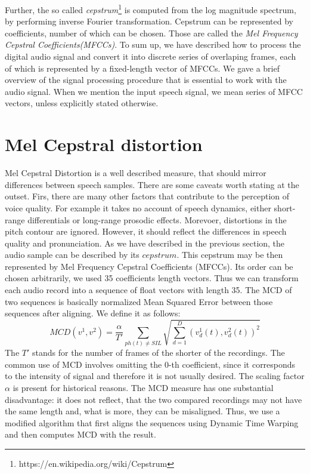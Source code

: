 Further, the so called \textit{cepstrum}\footnote{https://en.wikipedia.org/wiki/Cepstrum} is computed from the log magnitude spectrum, by performing inverse Fourier transformation.
Cepstrum can be represented by coefficients, number of which can be chosen.
Those are called the \textit{Mel Frequency Cepstral Coefficients(MFCCs)}.
To sum up, we have described how to process the digital audio signal and convert it into discrete series of overlaping frames, each of which is represented by a fixed-length vector of MFCCs.
\linebreak\linebreak
We gave a brief overview of the signal processing procedure that is essential to work with the audio signal.
When we mention the input speech signal, we mean series of MFCC vectors, unless explicitly stated otherwise.
\section{Mel Cepstral distortion}
\label{MCD-desc}
Mel Cepstral Distortion \cite{kubichek1993mel} is a well described measure, that should mirror differences between speech samples. There are some caveats worth stating at the outset.
Firs, there are many other factors that contribute to the perception of voice quality.
For example it takes no account of speech dynamics, either short-range differentials or long-range prosodic
effects.
Morevoer, distortions in the pitch contour are ignored.
However, it should reflect the differences in speech quality and pronunciation.
\linebreak\linebreak
As we have described in the previous section, the audio sample can be described by its $cepstrum$.
This cepstrum may be then represented by Mel Frequency Cepstral Coefficients (MFCCs). Its order can be chosen arbitrarily, we used 35 coefficients length vectors. Thus we can transform each audio record into a sequence of float vectors with length 35. The MCD \cite{kubichek1993mel} of two sequences is basically normalized Mean Squared Error between those sequences after aligning. We define it as follows:
\begin{equation}
MCD(v^1, v^2) = \frac{\alpha}{T'}\sum_{ph(t) \neq SIL}\sqrt{\sum_{d=1}^{D}(v_d^1(t), v_d^2(t))^2}
\end{equation}
The $T'$ stands for the number of frames of the shorter of the recordings.
The common use of MCD involves omitting the $0$-th coefficient, since it corresponds to the intensity of signal and therefore it is not usually desired. The scaling factor $\alpha$ is present for historical reasons.
\linebreak\linebreak
The MCD measure has one substantial disadvantage: it does not reflect, that the two compared recordings may not have the same length and, what is more, they can be misaligned.
Thus, we use a modified algorithm that first aligns the sequences using Dynamic Time Warping and then computes MCD with the result.
